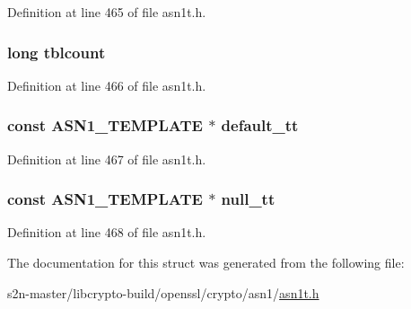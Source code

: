 Definition at line 465 of file asn1t.\+h.

\subsubsection[{\texorpdfstring{tblcount}{tblcount}}]{\setlength{\rightskip}{0pt plus 5cm}long tblcount}\hypertarget{struct_a_s_n1___a_d_b__st_a2094f5b6baf105bce269857f1c1f96c4}{}\label{struct_a_s_n1___a_d_b__st_a2094f5b6baf105bce269857f1c1f96c4}


Definition at line 466 of file asn1t.\+h.

\subsubsection[{\texorpdfstring{default\+\_\+tt}{default_tt}}]{\setlength{\rightskip}{0pt plus 5cm}const {\bf A\+S\+N1\+\_\+\+T\+E\+M\+P\+L\+A\+TE} $\ast$ default\+\_\+tt}\hypertarget{struct_a_s_n1___a_d_b__st_a9712b62988e6c417804161048b6d01cb}{}\label{struct_a_s_n1___a_d_b__st_a9712b62988e6c417804161048b6d01cb}


Definition at line 467 of file asn1t.\+h.

\subsubsection[{\texorpdfstring{null\+\_\+tt}{null_tt}}]{\setlength{\rightskip}{0pt plus 5cm}const {\bf A\+S\+N1\+\_\+\+T\+E\+M\+P\+L\+A\+TE} $\ast$ null\+\_\+tt}\hypertarget{struct_a_s_n1___a_d_b__st_a3c5b7b277c9a58eec6442229d391eb25}{}\label{struct_a_s_n1___a_d_b__st_a3c5b7b277c9a58eec6442229d391eb25}


Definition at line 468 of file asn1t.\+h.



The documentation for this struct was generated from the following file\+:\begin{DoxyCompactItemize}
\item 
s2n-\/master/libcrypto-\/build/openssl/crypto/asn1/\hyperlink{crypto_2asn1_2asn1t_8h}{asn1t.\+h}\end{DoxyCompactItemize}
